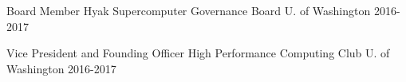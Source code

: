 


\begin{cventries}


\cventry
{Board Member} %
{Hyak Supercomputer Governance Board} %
{U. of Washington} %
{2016-2017} %
{}
    

\cventry
{Vice President and Founding Officer} %
{High Performance Computing Club} %
{U. of Washington} %
{2016-2017} %
{}



\end{cventries}
